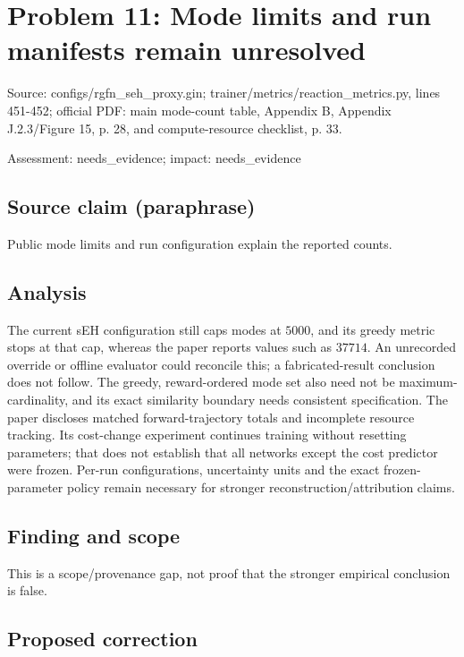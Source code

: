 \documentclass[11pt]{article}
\begin{document}
\section*{Problem 11: Mode limits and run manifests remain unresolved}

Source: configs/rgfn\_seh\_proxy.gin; trainer/metrics/reaction\_metrics.py, lines 451-452; official PDF: main mode-count table, Appendix B, Appendix J.2.3/Figure 15, p. 28, and compute-resource checklist, p. 33.

Assessment: needs\_evidence; impact: needs\_evidence

\subsection*{Source claim (paraphrase)}

Public mode limits and run configuration explain the reported counts.

\subsection*{Analysis}

The current sEH configuration still caps modes at \(5000\), and its greedy metric stops at that cap, whereas the paper reports values such as \(37714\). An unrecorded override or offline evaluator could reconcile this; a fabricated-result conclusion does not follow. The greedy, reward-ordered mode set also need not be maximum-cardinality, and its exact similarity boundary needs consistent specification. The paper discloses matched forward-trajectory totals and incomplete resource tracking. Its cost-change experiment continues training without resetting parameters; that does not establish that all networks except the cost predictor were frozen. Per-run configurations, uncertainty units and the exact frozen-parameter policy remain necessary for stronger reconstruction/attribution claims.

\subsection*{Finding and scope}

This is a scope/provenance gap, not proof that the stronger empirical conclusion is false.

\subsection*{Proposed correction}
\end{document}
